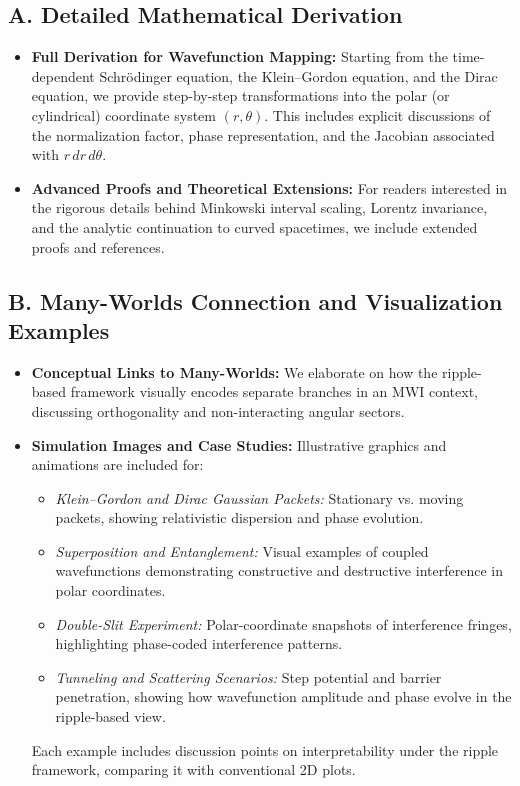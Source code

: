 \documentclass{article}
\begin{document}
\subsection*{A. Detailed Mathematical Derivation}
\begin{itemize}
    \item \textbf{Full Derivation for Wavefunction Mapping:} 
    Starting from the time-dependent Schr\"odinger equation, the Klein--Gordon equation, and the Dirac equation, we provide step-by-step transformations into the polar (or cylindrical) coordinate system \( (r, \theta) \). This includes explicit discussions of the normalization factor, phase representation, and the Jacobian associated with \( r\,dr\,d\theta \).
    \item \textbf{Advanced Proofs and Theoretical Extensions:}
    For readers interested in the rigorous details behind Minkowski interval scaling, Lorentz invariance, and the analytic continuation to curved spacetimes, we include extended proofs and references. 
\end{itemize}

\subsection*{B. Many-Worlds Connection and Visualization Examples}
\begin{itemize}
    \item \textbf{Conceptual Links to Many-Worlds:}
    We elaborate on how the ripple-based framework visually encodes separate branches in an MWI context, discussing orthogonality and non-interacting angular sectors.
    \item \textbf{Simulation Images and Case Studies:}
    Illustrative graphics and animations are included for:
    \begin{itemize}
        \item \textit{Klein--Gordon and Dirac Gaussian Packets:} Stationary vs. moving packets, showing relativistic dispersion and phase evolution.
        \item \textit{Superposition and Entanglement:} Visual examples of coupled wavefunctions demonstrating constructive and destructive interference in polar coordinates.
        \item \textit{Double-Slit Experiment:} Polar-coordinate snapshots of interference fringes, highlighting phase-coded interference patterns.
        \item \textit{Tunneling and Scattering Scenarios:} Step potential and barrier penetration, showing how wavefunction amplitude and phase evolve in the ripple-based view.
    \end{itemize}
    Each example includes discussion points on interpretability under the ripple framework, comparing it with conventional 2D plots.
\end{itemize}
\end{document}
